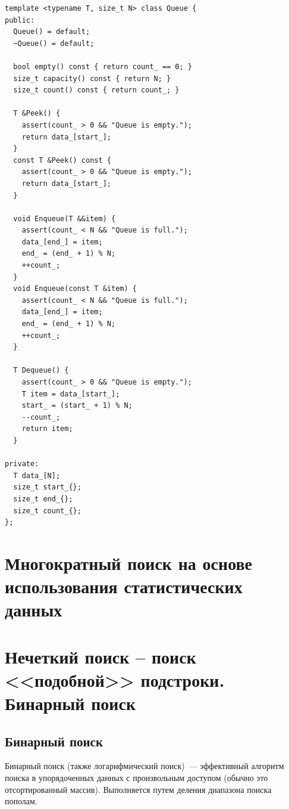 \begin{verbatim}
template <typename T, size_t N> class Queue {
public:
  Queue() = default;
  ~Queue() = default;

  bool empty() const { return count_ == 0; }
  size_t capacity() const { return N; }
  size_t count() const { return count_; }

  T &Peek() {
    assert(count_ > 0 && "Queue is empty.");
    return data_[start_];
  }
  const T &Peek() const {
    assert(count_ > 0 && "Queue is empty.");
    return data_[start_];
  }

  void Enqueue(T &&item) {
    assert(count_ < N && "Queue is full.");
    data_[end_] = item;
    end_ = (end_ + 1) % N;
    ++count_;
  }
  void Enqueue(const T &item) {
    assert(count_ < N && "Queue is full.");
    data_[end_] = item;
    end_ = (end_ + 1) % N;
    ++count_;
  }

  T Dequeue() {
    assert(count_ > 0 && "Queue is empty.");
    T item = data_[start_];
    start_ = (start_ + 1) % N;
    --count_;
    return item;
  }

private:
  T data_[N];
  size_t start_{};
  size_t end_{};
  size_t count_{};
};
\end{verbatim}

%
%

\section{Многократный поиск на основе использования статистических данных}

%
%

\section{Нечеткий поиск – поиск <<подобной>> подстроки. Бинарный поиск}

\subsection{Бинарный поиск}
Бинарный поиск (также логарифмический поиск)~--- эффективный алгоритм поиска в упорядоченных данных с произвольным доступом
(обычно это отсортированный массив). Выполняется путем деления диапазона поиска пополам.

